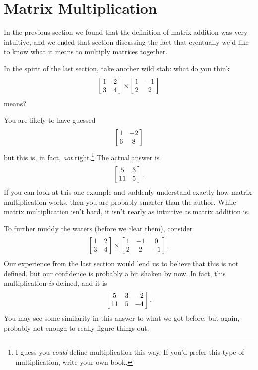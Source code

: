 \section{Matrix Multiplication}\label{sec:matrix_multiplication}


In the previous section we found that the definition of matrix addition was very intuitive, and we ended that section discussing the fact that eventually we'd like to know what it means to multiply matrices together. 

In the spirit of the last section, take another wild stab: what do you think $$\bmx{cc}1&2\\3&4\emx \times \bmx{cc} 1&-1\\2&2\emx$$ means?

You are likely to have guessed $$\bmx{cc} 1&-2\\6&8\emx$$ but this is, in fact, \textit{not} right.\footnote{I guess you \textit{could} define multiplication this way. If you'd prefer this type of multiplication, write your own book.} The actual answer is  $$\bmx{cc}5&3\\11&5\emx.$$ If you can look at this one example and suddenly understand exactly how matrix multiplication works, then you are probably smarter than the author. While matrix multiplication isn't hard, it isn't nearly as intuitive as matrix addition is.

To further muddy the waters (before we clear them), consider $$ \bmx{cc}1&2\\3&4\emx \times \bmx{ccc} 1&-1&0\\2&2&-1\emx.$$ Our experience from the last section would lend us to believe that this is not defined, but our confidence is probably a bit shaken by now. In fact, this multiplication \textit{is} defined, and it is $$\bmx{ccc}5&3&-2\\11&5&-4\emx.$$ You may see some similarity in this answer to what we got before, but again, probably not enough to really figure things out.


